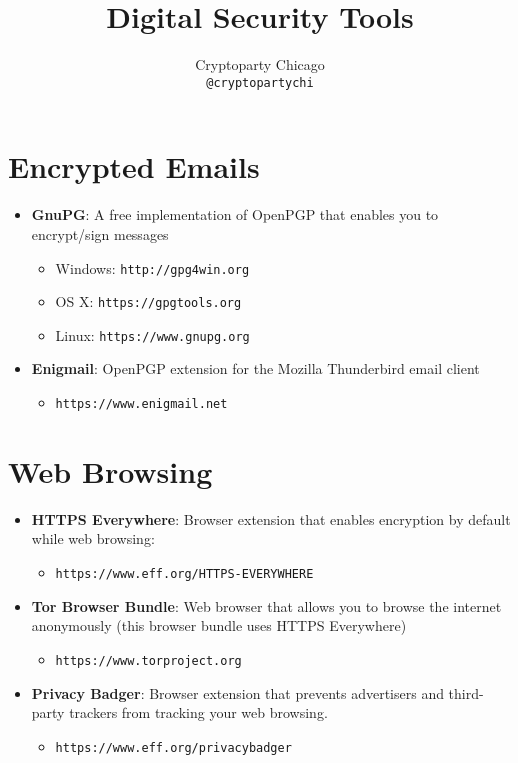 \documentclass[11pt]{memoir}
\date{}
\title{Digital Security Tools}
\author{Cryptoparty Chicago \\ 
\texttt{@cryptopartychi}}
\begin{document}
\maketitle

\section*{Encrypted Emails}

\begin{itemize}
   \item \textbf{GnuPG}: A free implementation of OpenPGP that enables you to encrypt/sign messages
      \begin{itemize}
         \item Windows: \texttt{http://gpg4win.org}
         \item OS X: \texttt{https://gpgtools.org}
         \item Linux: \texttt{https://www.gnupg.org}
      \end{itemize}
   \item \textbf{Enigmail}: OpenPGP extension for the Mozilla Thunderbird email client
      \begin{itemize}
         \item \texttt{https://www.enigmail.net}
      \end{itemize}
\end{itemize}

\section*{Web Browsing}
\begin{itemize}
   \item \textbf{HTTPS Everywhere}: Browser extension that enables encryption by default while web browsing:
       \begin{itemize}
          \item \texttt{https://www.eff.org/HTTPS-EVERYWHERE}
       \end{itemize} 
   \item \textbf{Tor Browser Bundle}: Web browser that allows you to browse the internet anonymously (this browser bundle uses HTTPS Everywhere)
       \begin{itemize}
          \item \texttt{https://www.torproject.org}
       \end{itemize} 
    \item \textbf{Privacy Badger}: Browser extension that prevents advertisers and third-party trackers from tracking your web browsing.
    \begin{itemize}
    \item \texttt{https://www.eff.org/privacybadger}
    \end{itemize}
\end{itemize}
\end{document}
